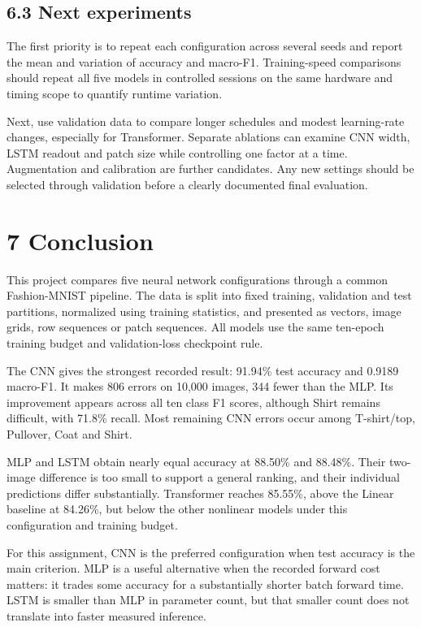 \subsection{6.3 Next experiments}
The first priority is to repeat each configuration across several seeds and
report the mean and variation of accuracy and macro-F1. Training-speed
comparisons should repeat all five models in controlled sessions on the same
hardware and timing scope to quantify runtime variation.

Next, use validation data to compare longer schedules and modest learning-rate
changes, especially for Transformer. Separate ablations can examine CNN width,
LSTM readout and patch size while controlling one factor at a time.
Augmentation and calibration are further candidates. Any new settings should
be selected through validation before a clearly documented final evaluation.


\section{7 Conclusion}
This project compares five neural network configurations through a common
Fashion-MNIST pipeline. The data is split into fixed training, validation and
test partitions, normalized using training statistics, and presented as
vectors, image grids, row sequences or patch sequences. All models use the
same ten-epoch training budget and validation-loss checkpoint rule.

The CNN gives the strongest recorded result: 91.94\% test accuracy and
0.9189 macro-F1. It makes 806 errors on 10,000 images, 344 fewer than the MLP.
Its improvement appears across all ten class F1 scores, although Shirt remains
difficult, with 71.8\% recall. Most remaining CNN errors occur among
T-shirt/top, Pullover, Coat and Shirt.

MLP and LSTM obtain nearly equal accuracy at 88.50\% and 88.48\%. Their
two-image difference is too small to support a general ranking, and their
individual predictions differ substantially. Transformer reaches 85.55\%,
above the Linear baseline at 84.26\%, but below the other nonlinear models
under this configuration and training budget.

For this assignment, CNN is the preferred configuration when test accuracy
is the main criterion. MLP is a useful alternative when the recorded forward
cost matters: it trades some accuracy for a substantially shorter batch
forward time. LSTM is smaller than MLP in parameter count, but that smaller
count does not translate into faster measured inference.

